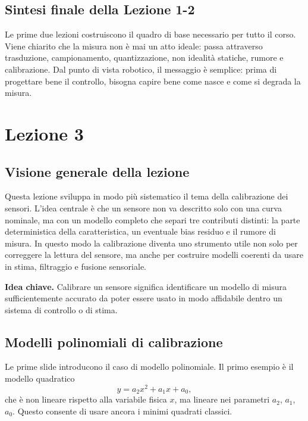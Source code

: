 \documentclass[11pt,a4paper]{article}
\begin{document}
\subsection*{Sintesi finale della Lezione 1-2}

Le prime due lezioni costruiscono il quadro di base necessario per tutto il corso. Viene chiarito che la misura non è mai un atto ideale: passa attraverso trasduzione, campionamento, quantizzazione, non idealità statiche, rumore e calibrazione. Dal punto di vista robotico, il messaggio è semplice: prima di progettare bene il controllo, bisogna capire bene come nasce e come si degrada la misura.


\clearpage
\section{Lezione 3}

\subsection{Visione generale della lezione}

Questa lezione sviluppa in modo più sistematico il tema della calibrazione dei sensori. L’idea centrale è che un sensore non va descritto solo con una curva nominale, ma con un modello completo che separi tre contributi distinti: la parte deterministica della caratteristica, un eventuale bias residuo e il rumore di misura. In questo modo la calibrazione diventa uno strumento utile non solo per correggere la lettura del sensore, ma anche per costruire modelli coerenti da usare in stima, filtraggio e fusione sensoriale.

\begin{focusbox}
\textbf{Idea chiave.} Calibrare un sensore significa identificare un modello di misura sufficientemente accurato da poter essere usato in modo affidabile dentro un sistema di controllo o di stima.
\end{focusbox}

\subsection{Modelli polinomiali di calibrazione}

Le prime slide introducono il caso di modello polinomiale. Il primo esempio è il modello quadratico
\[
y = a_2 x^2 + a_1 x + a_0,
\]
che è non lineare rispetto alla variabile fisica $x$, ma lineare nei parametri $a_2$, $a_1$, $a_0$. Questo consente di usare ancora i minimi quadrati classici.
\end{document}
